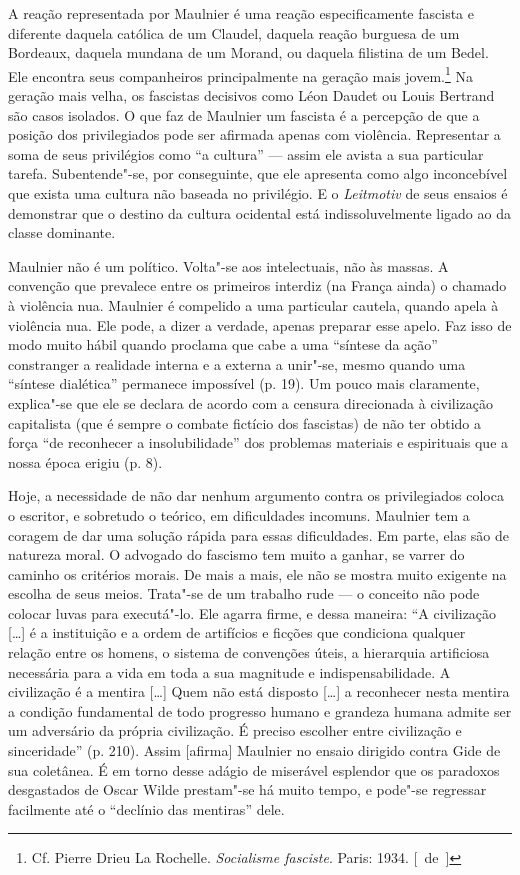A reação representada por Maulnier é uma reação especificamente fascista
e diferente daquela católica de um Claudel, daquela reação burguesa de
um Bordeaux, daquela mundana de um Morand, ou daquela filistina de um
Bedel. Ele encontra seus companheiros principalmente na geração mais
jovem.\footnote{Cf. Pierre Drieu La Rochelle. \emph{Socialisme
  fasciste}. Paris: 1934. [~de~]} Na geração mais velha, os fascistas
decisivos como Léon Daudet ou Louis Bertrand são casos isolados. O que
faz de Maulnier um fascista é a percepção de que a posição dos
privilegiados pode ser afirmada apenas com violência. Representar a soma
de seus privilégios como ``a cultura'' --- assim ele avista a sua
particular tarefa. Subentende"-se, por conseguinte, que ele apresenta
como algo inconcebível que exista uma cultura não baseada no privilégio. E o
\emph{Leitmotiv} de seus ensaios é demonstrar que o destino da cultura
ocidental está indissoluvelmente ligado ao da classe dominante.

Maulnier não é um político. Volta"-se aos intelectuais, não às massas. A
convenção que prevalece entre os primeiros interdiz (na França ainda) o
chamado à violência nua. Maulnier é compelido a uma particular cautela,
quando apela à violência nua. Ele pode, a dizer a verdade, apenas
preparar esse apelo. Faz isso de modo muito hábil quando proclama que
cabe a uma ``síntese da ação'' constranger a realidade interna e a
externa a unir"-se, mesmo quando uma ``síntese dialética'' permanece impossível (p.
19). Um pouco mais claramente, explica"-se que ele se declara de acordo
com a censura direcionada à civilização capitalista (que é sempre o
combate fictício dos fascistas) de não ter obtido a força ``de reconhecer
a insolubilidade'' dos problemas materiais e espirituais que
a nossa época erigiu (p. 8).

Hoje, a necessidade de não dar nenhum argumento contra os
privilegiados coloca o escritor, e sobretudo o teórico, em dificuldades
incomuns. Maulnier tem a coragem de dar uma solução rápida para essas
dificuldades. Em parte, elas são de natureza moral. O advogado do
fascismo tem muito a ganhar, se varrer do caminho os critérios morais.
De mais a mais, ele não se mostra muito exigente na escolha de seus
meios. Trata"-se de um trabalho rude --- o conceito não pode colocar luvas
para executá"-lo. Ele agarra firme, e dessa maneira: ``A civilização
{[}\ldots{}{]} é a instituição e a ordem de artifícios e ficções que
condiciona qualquer relação entre os homens, o sistema de convenções
úteis, a hierarquia artificiosa necessária para a vida em toda a sua
magnitude e indispensabilidade. A civilização é a mentira {[}\ldots{}{]} Quem
não está disposto {[}\ldots{}{]} a reconhecer nesta mentira a condição
fundamental de todo progresso humano e grandeza humana admite ser um
adversário da própria civilização. É preciso escolher entre civilização
e sinceridade'' (p. 210). Assim {[}afirma{]} Maulnier no ensaio dirigido
contra Gide de sua coletânea. É em torno desse adágio de miserável
esplendor que os paradoxos desgastados de Oscar Wilde prestam"-se há
muito tempo, e pode"-se regressar facilmente até o ``declínio das
mentiras'' dele.

